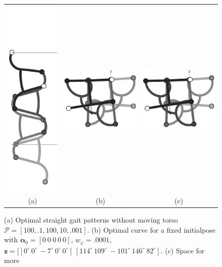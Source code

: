 \documentclass[10pt,a4paper]{article}
\begin{document}
\begin{figure}[h]
\begin{center}

\begin{tabular}{ccc}
\includegraphics[scale=1]{../Pics/py/n_belly_100_10_001.pdf}&
\includegraphics[scale=1]{../Pics/py/U-turn.pdf}&
\includegraphics[scale=1]{../Pics/py/U-turn.pdf} \\
(a) & (b) & (c)\\
\end{tabular}

\caption{
(a) Optimal straight gait patterns without moving torso $\mathcal{P} = [100, .1, 100, 10, .001]$.
(b) Optimal curve for a fixed initialpose with $\bm{\alpha}_0 = [0~0~0~0~0]$, $w_\varphi = .0001$, $\bm{z}=[[0^\circ~0^\circ~-7^\circ~0^\circ~0^\circ]~[114^\circ~109^\circ~-101^\circ~146^\circ~82^\circ]$.
(c) Space for more 
}
\label{fig:straight_gait_no_torso}
\end{center}
\end{figure}
\end{document}
